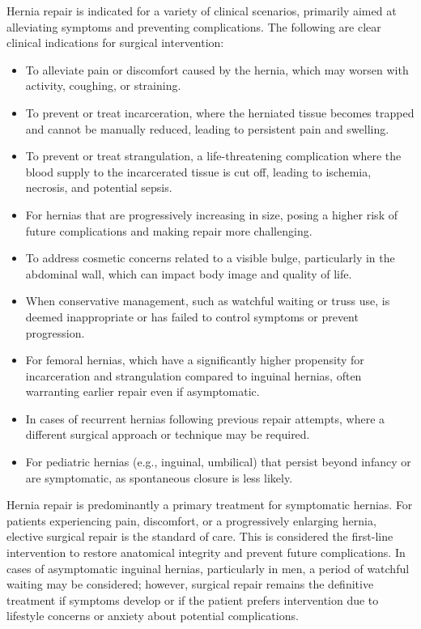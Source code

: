 Hernia repair is indicated for a variety of clinical scenarios, primarily aimed at alleviating symptoms and preventing complications. The following are clear clinical indications for surgical intervention:

\begin{itemize}
  \item To alleviate pain or discomfort caused by the hernia, which may worsen with activity, coughing, or straining.
  \item To prevent or treat incarceration, where the herniated tissue becomes trapped and cannot be manually reduced, leading to persistent pain and swelling.
  \item To prevent or treat strangulation, a life-threatening complication where the blood supply to the incarcerated tissue is cut off, leading to ischemia, necrosis, and potential sepsis.
  \item For hernias that are progressively increasing in size, posing a higher risk of future complications and making repair more challenging.
  \item To address cosmetic concerns related to a visible bulge, particularly in the abdominal wall, which can impact body image and quality of life.
  \item When conservative management, such as watchful waiting or truss use, is deemed inappropriate or has failed to control symptoms or prevent progression.
  \item For femoral hernias, which have a significantly higher propensity for incarceration and strangulation compared to inguinal hernias, often warranting earlier repair even if asymptomatic.
  \item In cases of recurrent hernias following previous repair attempts, where a different surgical approach or technique may be required.
  \item For pediatric hernias (e.g., inguinal, umbilical) that persist beyond infancy or are symptomatic, as spontaneous closure is less likely.
\end{itemize}

Hernia repair is predominantly a primary treatment for symptomatic hernias. For patients experiencing pain, discomfort, or a progressively enlarging hernia, elective surgical repair is the standard of care. This is considered the first-line intervention to restore anatomical integrity and prevent future complications. In cases of asymptomatic inguinal hernias, particularly in men, a period of watchful waiting may be considered; however, surgical repair remains the definitive treatment if symptoms develop or if the patient prefers intervention due to lifestyle concerns or anxiety about potential complications.

